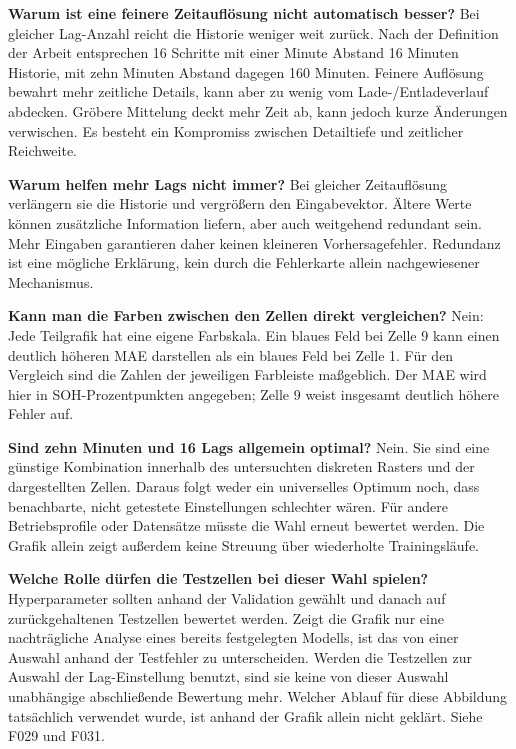 \documentclass[11pt,a4paper]{article}
\begin{document}
\textbf{Warum ist eine feinere Zeitauflösung nicht automatisch besser?} Bei gleicher Lag-Anzahl reicht die Historie weniger weit zurück. Nach der Definition der Arbeit entsprechen 16 Schritte mit einer Minute Abstand 16 Minuten Historie, mit zehn Minuten Abstand dagegen 160 Minuten. Feinere Auflösung bewahrt mehr zeitliche Details, kann aber zu wenig vom Lade-/\allowbreak{}Entladeverlauf abdecken. Gröbere Mittelung deckt mehr Zeit ab, kann jedoch kurze Änderungen verwischen. Es besteht ein Kompromiss zwischen Detailtiefe und zeitlicher Reichweite.

\textbf{Warum helfen mehr Lags nicht immer?} Bei gleicher Zeitauflösung verlängern sie die Historie und vergrößern den Eingabevektor. Ältere Werte können zusätzliche Information liefern, aber auch weitgehend redundant sein. Mehr Eingaben garantieren daher keinen kleineren Vorhersagefehler. Redundanz ist eine mögliche Erklärung, kein durch die Fehlerkarte allein nachgewiesener Mechanismus.

\textbf{Kann man die Farben zwischen den Zellen direkt vergleichen?} Nein: Jede Teilgrafik hat eine eigene Farbskala. Ein blaues Feld bei Zelle 9 kann einen deutlich höheren MAE darstellen als ein blaues Feld bei Zelle 1. Für den Vergleich sind die Zahlen der jeweiligen Farbleiste maßgeblich. Der MAE wird hier in SOH-Prozentpunkten angegeben; Zelle 9 weist insgesamt deutlich höhere Fehler auf.

\textbf{Sind zehn Minuten und 16 Lags allgemein optimal?} Nein. Sie sind eine günstige Kombination innerhalb des untersuchten diskreten Rasters und der dargestellten Zellen. Daraus folgt weder ein universelles Optimum noch, dass benachbarte, nicht getestete Einstellungen schlechter wären. Für andere Betriebsprofile oder Datensätze müsste die Wahl erneut bewertet werden. Die Grafik allein zeigt außerdem keine Streuung über wiederholte Trainingsläufe.

\textbf{Welche Rolle dürfen die Testzellen bei dieser Wahl spielen?} Hyperparameter sollten anhand der Validation gewählt und danach auf zurückgehaltenen Testzellen bewertet werden. Zeigt die Grafik nur eine nachträgliche Analyse eines bereits festgelegten Modells, ist das von einer Auswahl anhand der Testfehler zu unterscheiden. Werden die Testzellen zur Auswahl der Lag-Einstellung benutzt, sind sie keine von dieser Auswahl unabhängige abschließende Bewertung mehr. Welcher Ablauf für diese Abbildung tatsächlich verwendet wurde, ist anhand der Grafik allein nicht geklärt. Siehe F029 und F031.
\end{document}
